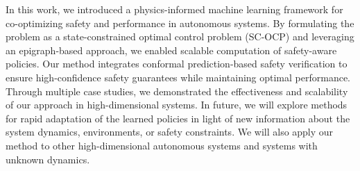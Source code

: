 In this work, we introduced a physics-informed machine learning framework for co-optimizing safety and performance in autonomous systems. 
By formulating the problem as a state-constrained optimal control problem (SC-OCP) and leveraging an epigraph-based approach, we enabled scalable computation of safety-aware policies. 
Our method integrates conformal prediction-based safety verification to ensure high-confidence safety guarantees while maintaining optimal performance. 
Through multiple case studies, we demonstrated the effectiveness and scalability of our approach in high-dimensional systems. 
In future, we will explore methods for rapid adaptation of the learned policies in light of new information about the system dynamics, environments, or safety constraints.
We will also apply our method to other high-dimensional autonomous systems and systems with unknown dynamics.



